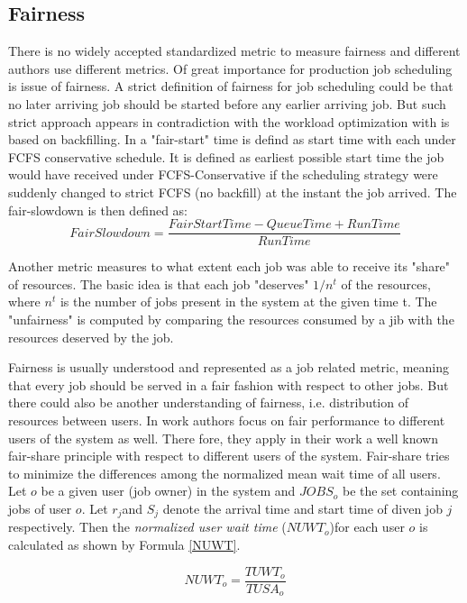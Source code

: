 \documentclass[a4paper,10pt]{article}
\begin{document}
\subsection{Fairness}
There is no widely accepted standardized metric to measure fairness and different authors use different metrics.
Of great importance for production job scheduling is issue of fairness. A strict definition of fairness for job scheduling could be that no later arriving job should be started before any earlier arriving job. But such strict approach appears in contradiction with the workload optimization with is based on backfilling.
In \cite{Backfilling} a "fair-start" time is defind as start time with each under FCFS conservative schedule. It is defined as earliest possible start time the job would have received under FCFS-Conservative if the scheduling strategy were suddenly changed to strict FCFS (no backfill) at the instant the job arrived. The fair-slowdown is then defined as:
 \begin{equation}
FairSlowdown=\frac{FairStartTime-QueueTime+RunTime}{RunTime}
\label{fair slowdown}
\end{equation}

Another metric measures to what extent each job was able to receive its "share" of resources. The basic idea is that each job "deserves" $1/n^{t}$ of the resources, where $n^{t}$ is the number of jobs present in the system at the given time t. The "unfairness" is computed by comparing the resources consumed by a jib with the resources deserved by the job.\cite{Rudova 2012} 

Fairness is usually understood and represented as a job related metric, meaning that every job should be served in a fair fashion with respect to other jobs. But there could also be another understanding of fairness, i.e. distribution of resources between users. In work \cite{Rudova 2012} authors focus on fair performance to different users of the system as well. There fore, they apply in their work a well known fair-share principle with respect to different users of the system. Fair-share tries to minimize the differences among the normalized mean wait time of all users. Let $o$ be a given user (job owner) in the system and $JOBS_{o}$ be the set containing jobs of user $o$. Let $r_{j}$and $S_{j}$ denote the arrival time and start time of diven job $j$ respectively. Then the \textit{normalized user wait time} ($NUWT_{o}$)for each user $o$ is calculated as shown by Formula \ref{NUWT}.

 \begin{equation}
NUWT_{o}=\frac{TUWT_{o}}{TUSA_{o}}
\label{NUWT}
\end{equation}
\end{document}
